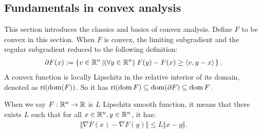 \documentclass[12pt]{article}
\begin{document}
    \subsection{Fundamentals in convex analysis}
        This section introduces the classics and basics of convex analysis. 
        Define $F$ to be convex in this section. 
        When $F$ is convex, the limiting subgradient and the regular subgradient reduced to the following definition:
        \begin{align*}
            \partial F(x) := \left\lbrace
                v \in \mathbb R^n \left|
                    (\forall y \in \mathbb R^n)\;  F(y) - F(x)  \ge \langle v, y - x\rangle
                \right.
            \right\rbrace. 
        \end{align*}
        A convex function is locally Lipschitz in the relative interior of its domain, denoted as $\operatorname{ri}(\operatorname{dom}(F))$. 
        So it has $\operatorname{ri}(\operatorname{dom} F)\subseteq \operatorname{dom}(\partial F) \subseteq \operatorname{dom} F$. 
        \par
        When we say $F:\mathbb R^n \rightarrow \mathbb R$ is $L$ Lipschitz smooth function, it means that there exists $L$ such that for all $x\in \mathbb R^n, y \in \mathbb R^n$, it has: 
        \begin{align*}
            \Vert \nabla F(x) - \nabla F(y)\Vert \le L \Vert x - y\Vert. 
        \end{align*}
\end{document}
